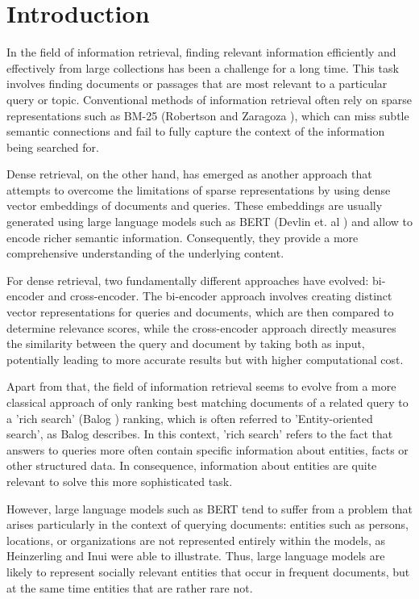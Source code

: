 \section{Introduction}\label{sec:introduction}

In the field of information retrieval, finding relevant information efficiently and effectively from large collections has been a challenge for a long time. This task involves finding documents or passages that are most relevant to a particular query or topic. Conventional methods of information retrieval often rely on sparse representations such as BM-25 (Robertson and Zaragoza \cite{BM25}), which can miss subtle semantic connections and fail to fully capture the context of the information being searched for.

Dense retrieval, on the other hand, has emerged as another approach that attempts to overcome the limitations of sparse representations by using dense vector embeddings of documents and queries. These embeddings are usually generated using large language models such as BERT (Devlin et. al \cite{bert}) and allow to encode richer semantic information. Consequently, they provide a more comprehensive understanding of the underlying content. 

For dense retrieval, two fundamentally different approaches have evolved: bi-encoder and cross-encoder. The bi-encoder approach involves creating distinct vector representations for queries and documents, which are then compared to determine relevance scores, while the cross-encoder approach directly measures the similarity between the query and document by taking both as input, potentially leading to more accurate results but with higher computational cost.

Apart from that, the field of information retrieval seems to evolve from a more classical approach of only ranking best matching documents of a related query to a 'rich search' (Balog \cite{balog2018entity}) ranking, which is often referred to 'Entity-oriented search', as Balog \cite{balog2018entity} describes. In this context, 'rich search' refers to the fact that answers to queries more often contain specific information about entities, facts or other structured data. In consequence, information about entities are quite relevant to solve this more sophisticated task.

However, large language models such as BERT tend to suffer from a problem that arises particularly in the context of querying documents: entities such as persons, locations, or organizations are not represented entirely within the models, as Heinzerling and Inui \cite{limitations} were able to illustrate. Thus, large language models are likely to represent socially relevant entities that occur in frequent documents, but at the same time entities that are rather rare not.

